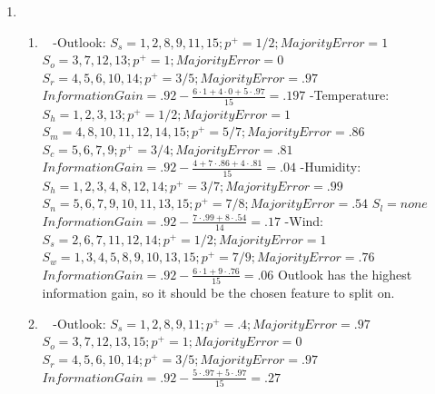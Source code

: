 \documentclass[12pt, fullpage,letterpaper]{article}
\begin{document}
\begin{enumerate}
\item~ 
\begin{enumerate}
\item~
\newline -Outlook:
	\newline $S_s = 1, 2,8, 9, 11, 15; p^+=1/2; Majority Error=1$
	\newline $S_o=3, 7, 12, 13; p^+ = 1; Majority Error=0$
	\newline $S_r=4, 5, 6, 10, 14; p^+=3/5; Majority Error=.97$
	\newline $Information Gain=.92-\frac{6\cdot1+4\cdot0+5\cdot.97}{15}=.197$
	\newline -Temperature:
	\newline $S_h = 1, 2, 3, 13; p^+=1/2; Majority Error=1$
	\newline $S_m=4, 8, 10, 11, 12, 14, 15; p^+=5/7; Majority Error=.86$
	\newline $S_c=5, 6, 7, 9; p^+=3/4; Majority Error=.81$
	\newline $Information Gain=.92-\frac{4+7\cdot.86+4\cdot.81}{15}=.04$
	\newline -Humidity:
	\newline $S_h = 1, 2, 3, 4, 8, 12, 14; p^+=3/7; Majority Error=.99$
	\newline $S_n=5, 6, 7, 9, 10, 11, 13, 15; p^+=7/8; Majority Error=.54$
	\newline $S_l=none$
	\newline $Information Gain=.92-\frac{7\cdot.99+8\cdot.54}{14}=.17$
	\newline -Wind:
	\newline $S_s = 2, 6, 7, 11, 12, 14; p^+=1/2; Majority Error=1$
	\newline $S_w=1, 3, 4, 5, 8, 9, 10, 13, 15; p^+=7/9; Majority Error=.76$
	\newline $Information Gain=.92-\frac{6\cdot1+9\cdot.76}{15}=.06$
	\newline
	\newline Outlook has the highest information gain, so it should be the chosen feature to split on. 
\item~
\newline -Outlook:
	\newline $S_s = 1, 2,8, 9, 11; p^+=.4; Majority Error=.97$
	\newline $S_o=3, 7, 12, 13, 15; p^+ = 1; Majority Error=0$
	\newline $S_r=4, 5, 6, 10, 14; p^+=3/5; Majority Error=.97$
	\newline $Information Gain=.92-\frac{5\cdot.97+5\cdot.97}{15}=.27$

\end{enumerate}
\end{enumerate}
\end{document}

